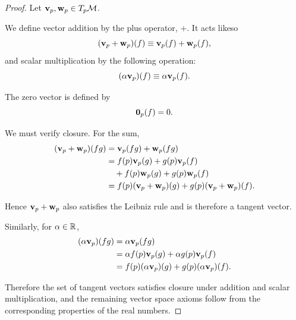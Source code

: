 		\begin{proof}
			Let $\vb{v}_p,\vb{w}_p\in T_p\mathcal{M}$.

			We define vector addition by the plus operator, $+$. It acts likeso
			\begin{equation}
				(\vb{v}_p+\vb{w}_p)(f)
				\equiv
				\vb{v}_p(f)+\vb{w}_p(f),
				\label{eq:tangent-vector-addition}
			\end{equation}
			and scalar multiplication by the following operation:
			\begin{equation}
				(\alpha\vb{v}_p)(f)
				\equiv
				\alpha\vb{v}_p(f).
				\label{eq:tangent-vector-scalar-multiplication}
			\end{equation}

			The zero vector is defined by
			\begin{equation}
				\vb{0}_p(f)=0.
				\label{eq:tangent-zero-vector}
			\end{equation}

			We must verify closure. For the sum,
			\begin{align}
				(\vb{v}_p+\vb{w}_p)(fg)
				&=
				\vb{v}_p(fg)+\vb{w}_p(fg)
				\nonumber\\
				&=
				f(p)\vb{v}_p(g)
				+g(p)\vb{v}_p(f)
				\nonumber\\
				&\quad
				+f(p)\vb{w}_p(g)
				+g(p)\vb{w}_p(f)
				\nonumber\\
				&=
				f(p)(\vb{v}_p+\vb{w}_p)(g)
				+
				g(p)(\vb{v}_p+\vb{w}_p)(f).
				\label{eq:tangent-space-closure}
			\end{align}

			Hence $\vb{v}_p+\vb{w}_p$ also satisfies the Leibniz rule and is
			therefore a tangent vector.

			Similarly, for $\alpha\in\mathbb{R}$,
			\begin{align}
				(\alpha\vb{v}_p)(fg)
				&=
				\alpha\vb{v}_p(fg)
				\nonumber\\
				&=
				\alpha f(p)\vb{v}_p(g)
				+
				\alpha g(p)\vb{v}_p(f)
				\nonumber\\
				&=
				f(p)(\alpha\vb{v}_p)(g)
				+
				g(p)(\alpha\vb{v}_p)(f).
				\label{eq:tangent-space-scalar-closure}
			\end{align}

			Therefore the set of tangent vectors satisfies closure under
			addition and scalar multiplication, and the remaining vector
			space axioms follow from the corresponding properties of the
			real numbers.
		\end{proof}

